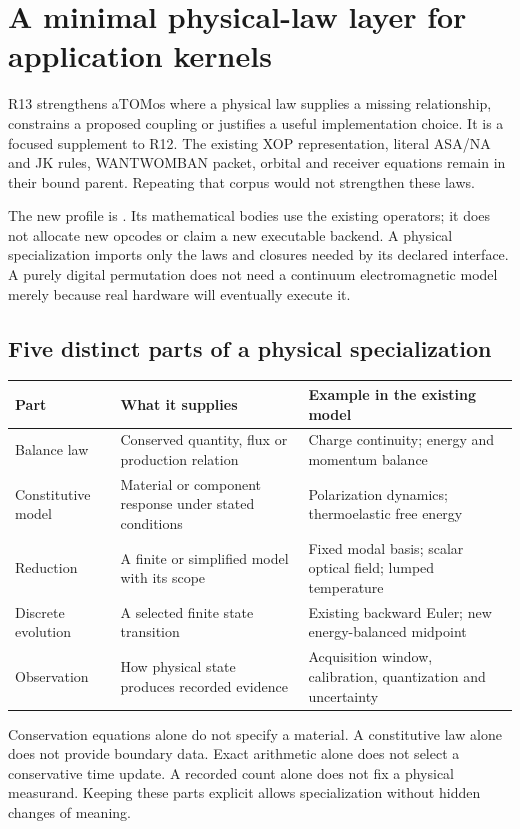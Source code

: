 \section{A minimal physical-law layer for application kernels}
\label{sec:r13-core}
R13 strengthens aTOMos where a physical law supplies a missing relationship,
constrains a proposed coupling or justifies a useful implementation choice.
It is a focused supplement to R12. The existing XOP representation, literal
ASA/NA and JK rules, WANTWOMBAN packet, orbital and receiver equations remain
in their bound parent. Repeating that corpus would not strengthen these laws.

The new profile is . Its mathematical bodies use the
existing  operators; it does not allocate new opcodes or claim a
new executable backend. A physical specialization imports only the laws and
closures needed by its declared interface. A purely digital permutation does
not need a continuum electromagnetic model merely because real hardware will
eventually execute it.

\subsection{Five distinct parts of a physical specialization}
\begin{center}\small
\begin{tabularx}{\linewidth}{@{}P{30mm}Y Y@{}}
\toprule Part & What it supplies & Example in the existing model\\\midrule
Balance law & Conserved quantity, flux or production relation & Charge continuity; energy and momentum balance\\
Constitutive model & Material or component response under stated conditions & Polarization dynamics; thermoelastic free energy\\
Reduction & A finite or simplified model with its scope & Fixed modal basis; scalar optical field; lumped temperature\\
Discrete evolution & A selected finite state transition & Existing backward Euler; new energy-balanced midpoint\\
Observation & How physical state produces recorded evidence & Acquisition window, calibration, quantization and uncertainty\\
\bottomrule
\end{tabularx}\end{center}
Conservation equations alone do not specify a material. A constitutive law alone
does not provide boundary data. Exact arithmetic alone does not select a
conservative time update. A recorded count alone does not fix a physical
measurand. Keeping these parts explicit allows specialization without hidden
changes of meaning.


